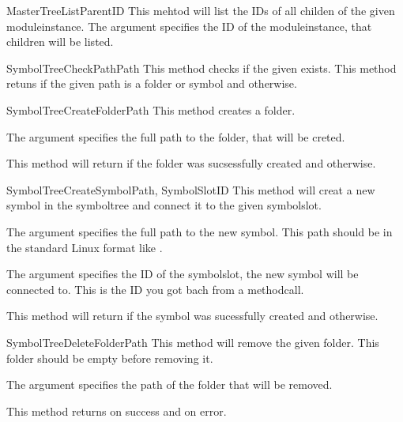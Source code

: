 \begin{methoddesc}[Core]{MasterTreeList}{ParentID}
This mehtod will list the IDs of all childen of the given moduleinstance. The argument  specifies the 
ID of the moduleinstance, that children will be listed. 
\end{methoddesc}



\begin{methoddesc}[Core]{SymbolTreeCheckPath}{Path}
This method checks if the given  exists. This method retuns   if the given path is a folder or symbol
and  otherwise.
\end{methoddesc}



\begin{methoddesc}[Core]{SymbolTreeCreateFolder}{Path}
This method creates a folder. 

The argument  specifies the full path to the folder, that will be creted. 

This method will return  if the folder was sucsessfully created and 
 otherwise.
\end{methoddesc}




\begin{methoddesc}[Core]{SymbolTreeCreateSymbol}{Path, SymbolSlotID}
This method will creat a new symbol in the symboltree and connect it to the 
given symbolslot.

The argument  specifies the full path to the new symbol. This path 
should be in the standard Linux format like .

The argument  specifies the ID of the symbolslot, the new
symbol will be connected to. This is the ID you got bach from a
 methodcall.

This method will return  if the symbol was sucessfully created and
 otherwise.

\end{methoddesc}



\begin{methoddesc}[Core]{SymbolTreeDeleteFolder}{Path}
This method will remove the given folder. This folder should be empty before removing it.

The argument  specifies the path of the folder that will be removed. 

This method returns  on success and  on error.
\end{methoddesc}



